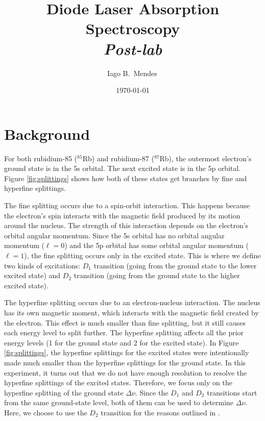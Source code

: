 \documentclass{../paper}
\begin{document}
\title{Diode Laser Absorption Spectroscopy \\ {\em Post-lab}}

\author{Iago B.~Mendes\,}

\date{\today}

\maketitle

\section{Background}

For both rubidium-85 ($^{85}$Rb) and rubidium-87 ($^{87}$Rb), the outermost electron's ground state is in the 5s orbital. The next excited state is in the 5p orbital. Figure \ref{fig:splittings} shows how both of these states get branches by fine and hyperfine splittings.

The fine splitting occurs due to a spin-orbit interaction. This happens because the electron's spin interacts with the magnetic field produced by its motion around the nucleus. The strength of this interaction depends on the electron's orbital angular momentum. Since the 5s orbital has no orbital angular momentum ($\ell = 0$) and the 5p orbital has some orbital angular momentum ($\ell = 1$), the fine splitting occurs only in the excited state. This is where we define two kinds of excitations: $D_1$ transition (going from the ground state to the lower excited state) and $D_2$ transition (going from the ground state to the higher excited state).

The hyperfine splitting occurs due to an electron-nucleus interaction. The nucleus has its own magnetic moment, which interacts with the magnetic field created by the electron. This effect is much smaller than fine splitting, but it still causes each energy level to split further. The hyperfine splitting affects all the prior energy levels (1 for the ground state and 2 for the excited state). In Figure \ref{fig:splittings}, the hyperfine splittings for the excited states were intentionally made much smaller than the hyperfine splittings for the ground state. In this experiment, it turns out that we do not have enough resolution to resolve the hyperfine splittings of the excited states. Therefore, we focus only on the hyperfine splitting of the ground state $\Delta\nu$. Since the $D_1$ and $D_2$ transitions start from the same ground-state level, both of them can be used to determine $\Delta\nu$. Here, we choose to use the $D_2$ transition for the reasons outlined in \cite{Brandenberger}.
\end{document}
